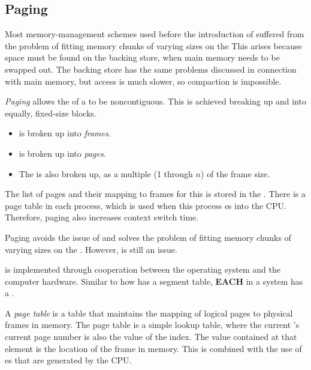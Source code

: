 \subsection{Paging}\label{subsec:Paging}
Most memory-management schemes used before the introduction of  suffered from the problem of fitting memory chunks of varying sizes on the 
This arises because space must be found on the backing store, when main memory needs to be swapped out.
The backing store has the same  problems discussed in connection with main memory, but access is much slower, so compaction is impossible.

\begin{definition}[Paging]\label{def:Paging}
  \emph{Paging} allows the  of a  to be noncontiguous.
  This is achieved breaking up  and  into equally, fixed-size blocks.
  \begin{itemize}[noitemsep]
  \item {} is broken up into \emph{frames}.
  \item {} is broken up into \emph{pages}.
  \item The  is also broken up, as a multiple (1 through $n$) of the frame size.
  \end{itemize}

  The list of pages and their mapping to frames for this  is stored in the .
  There is a page table in each process, which is used when this process es into the CPU.\@
  Therefore, paging also increases context switch time.

  Paging avoids the issue of  and solves the problem of fitting memory chunks of varying sizes on the .
  However,  is still an issue.
\end{definition}

 is implemented through cooperation between the operating system and the computer hardware.
Similar to how  has a segment table, \textbf{EACH } in a  system has a .

\begin{definition}\label{def:Page_Table}
  A \emph{page table} is a table that maintains the mapping of logical pages to physical frames in memory.
  The page table is a simple lookup table, where the current 's current page number is also the value of the index.
  The value contained at that element is the location of the frame in memory.
  This is combined with the use of es that are generated by the CPU.\@
\end{definition}

